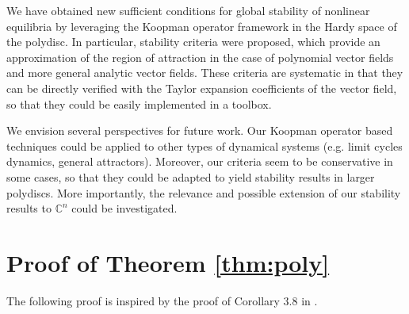 \documentclass{article}
\begin{document}
We have obtained new sufficient conditions for global stability of nonlinear equilibria by leveraging the Koopman operator framework in the Hardy space of the polydisc. In particular, stability criteria were proposed, which provide an approximation of the region of attraction in the case of polynomial vector fields and more general analytic vector fields. 
These criteria are systematic in that they can be directly verified with the Taylor expansion coefficients of the vector field, so that they could be easily implemented in a toolbox.

We envision several perspectives for future work.
Our Koopman operator based techniques could be applied to other types of dynamical systems (e.g. limit cycles dynamics, general attractors). Moreover, our criteria seem to be conservative in some cases, so that they could be adapted to yield stability results in larger polydiscs. More importantly, the relevance and possible extension of our stability results to $\mathbb{C}^n$ could be investigated.



\appendix
\label{sec:appendix}



\section{Proof of Theorem \ref{thm:poly}}
\label{sec:appendix_proof1}

The following proof is inspired by the proof of Corollary 3.8 in \cite{CMZAM2}.
\end{document}
